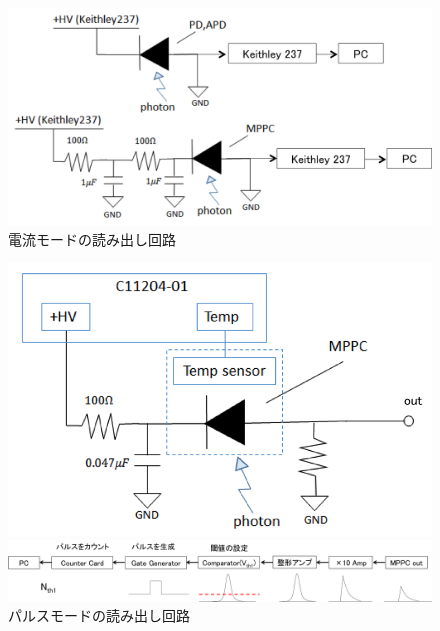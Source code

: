 \begin{figure}[H]
 \begin{center}
 \includegraphics[bb=0.000000 0.000000 515.957348 264.458138,width=1\hsize]{image2/chapter5/read_circuit_current.png} 
 \end{center}
 \caption{電流モードの読み出し回路}
 \label{fig:read_circuit_current}
\end{figure}


\begin{figure}[H]
 \begin{minipage}{0.5\vsize}
 \hspace{3 cm}
   \includegraphics[bb=0.000000 0.000000 377.728774 242.859924,width=0.8\hsize]{image2/chapter5/read_circuit_pulse.png} 
  \vspace{0 cm}
   \end{minipage}
 \begin{minipage}{0.5\vsize}  
  \hspace{-1 cm}
 \includegraphics[bb=0.000000 0.000000 1008.876600 145.907938,width=1.5\hsize]{image2/chapter5/read_circuit_pulse2.png} 
 \end{minipage}
 \begin{center}
  \caption{パルスモードの読み出し回路}
  \label{fig:read_circuit_current}
  \end{center}
\end{figure}




